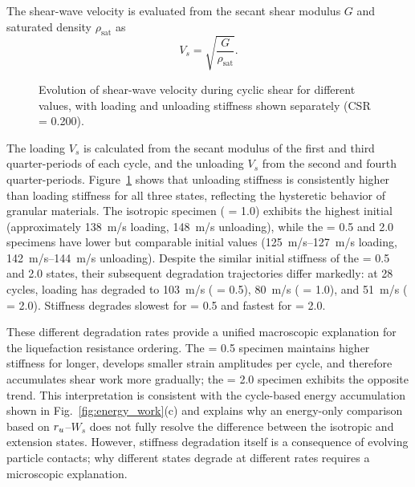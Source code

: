 The shear-wave velocity is evaluated from the secant shear modulus $G$ and saturated density $\rho_{\mathrm{sat}}$ as \citep{XuLing2015}
\begin{equation}
V_s = \sqrt{\frac{G}{\rho_{\mathrm{sat}}}}.
\label{eq:vs_definition}
\end{equation}

\begin{figure}[t]
  \centering
  \caption{Evolution of shear-wave velocity during cyclic shear for different \Kzero{} values, with loading and unloading stiffness shown separately (CSR = 0.200).}
  \label{fig:vs_evolution}
\end{figure}

The loading $V_s$ is calculated from the secant modulus of the first and third quarter-periods of each cycle, and the unloading $V_s$ from the second and fourth quarter-periods. Figure~\ref{fig:vs_evolution} shows that unloading stiffness is consistently higher than loading stiffness for all three states, reflecting the hysteretic behavior of granular materials. The isotropic specimen (\Kzero{} = 1.0) exhibits the highest initial \Vs{} (approximately \SI{138}{m/s} loading, \SI{148}{m/s} unloading), while the \Kzero{} = 0.5 and 2.0 specimens have lower but comparable initial values (\SIrange{125}{127}{m/s} loading, \SIrange{142}{144}{m/s} unloading). Despite the similar initial stiffness of the \Kzero{} = 0.5 and 2.0 states, their subsequent degradation trajectories differ markedly: at 28 cycles, loading \Vs{} has degraded to \SI{103}{m/s} (\Kzero{} = 0.5), \SI{80}{m/s} (\Kzero{} = 1.0), and \SI{51}{m/s} (\Kzero{} = 2.0). Stiffness degrades slowest for \Kzero{} = 0.5 and fastest for \Kzero{} = 2.0.

These different degradation rates provide a unified macroscopic explanation for the liquefaction resistance ordering. The \Kzero{} = 0.5 specimen maintains higher stiffness for longer, develops smaller strain amplitudes per cycle, and therefore accumulates shear work more gradually; the \Kzero{} = 2.0 specimen exhibits the opposite trend. This interpretation is consistent with the cycle-based energy accumulation shown in Fig.~\ref{fig:energy_work}(c) and explains why an energy-only comparison based on $r_u$--$W_s$ does not fully resolve the difference between the isotropic and extension states. However, stiffness degradation itself is a consequence of evolving particle contacts; why different \Kzero{} states degrade at different rates requires a microscopic explanation.

